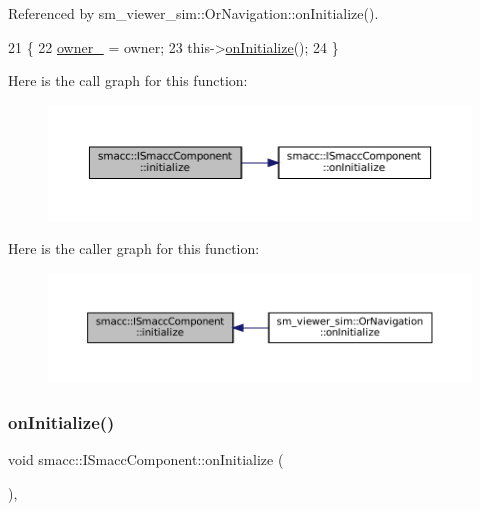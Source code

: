 Referenced by sm\+\_\+viewer\+\_\+sim\+::\+Or\+Navigation\+::on\+Initialize().


\begin{DoxyCode}
21 \{
22     \hyperlink{classsmacc_1_1ISmaccComponent_a909590e672450ce0eb0d8facb45c737a}{owner\_} = owner;
23     this->\hyperlink{classsmacc_1_1ISmaccComponent_ae6f71d008db12553912e9436184b9e65}{onInitialize}();
24 \}
\end{DoxyCode}
Here is the call graph for this function\+:
\nopagebreak
\begin{figure}[H]
\begin{center}
\leavevmode
\includegraphics[width=350pt]{classsmacc_1_1ISmaccComponent_a3378552cb1a86aa26a07c0edc057448b_cgraph}
\end{center}
\end{figure}
Here is the caller graph for this function\+:
\nopagebreak
\begin{figure}[H]
\begin{center}
\leavevmode
\includegraphics[width=350pt]{classsmacc_1_1ISmaccComponent_a3378552cb1a86aa26a07c0edc057448b_icgraph}
\end{center}
\end{figure}
\mbox{\label{classsmacc_1_1ISmaccComponent_ae6f71d008db12553912e9436184b9e65}} 
\subsubsection{\texorpdfstring{on\+Initialize()}{onInitialize()}}
{\footnotesize\ttfamily void smacc\+::\+I\+Smacc\+Component\+::on\+Initialize (\begin{DoxyParamCaption}{ }\end{DoxyParamCaption})\hspace{0.3cm}{\ttfamily [protected]}, {\ttfamily [virtual]}}



